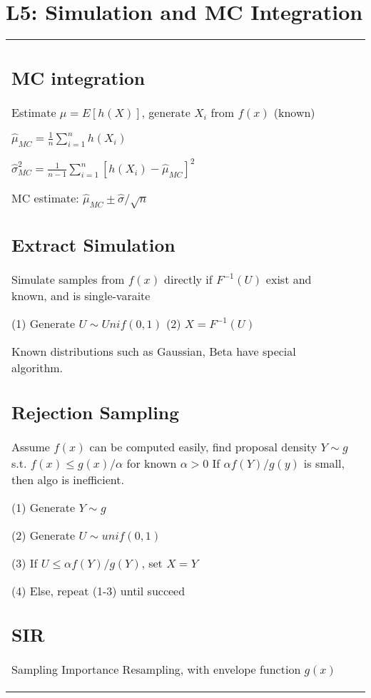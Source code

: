 \section{L5: Simulation and MC Integration}

\begin{tabulary}{\textwidth}{l L}

\subsection{MC integration}

Estimate $\mu = E[h(X)]$, generate $X_i$ from $f(x)$ (known)

$\hat\mu_{MC} = \frac{1}{n} \sum_{i=1}^n h(X_i)$

$\hat\sigma^2_{MC} = \frac{1}{n-1} \sum_{i=1}^n [h(X_i) - \hat\mu_{MC}]^2$

MC estimate: $\hat\mu_{MC} \pm \hat\sigma / \sqrt{n}$

\subsection{Extract Simulation}

Simulate samples from $f(x)$ directly if $F^{-1}(U)$ exist and known, and is single-varaite

(1) Generate $U\sim Unif(0, 1)$ (2) $X = F^{-1}(U)$

Known distributions such as Gaussian, Beta have special algorithm.

\subsection{Rejection Sampling}

Assume $f(x)$ can be computed easily, find proposal density $Y\sim g$ s.t. $f(x) \leq g(x)/\alpha$ for known $\alpha > 0$
If $\alpha f(Y)/g(y)$ is small, then algo is inefficient.

(1) Generate $Y\sim g$

(2) Generate $U\sim unif(0, 1)$

(3) If $U \leq \alpha f(Y) / g(Y)$, set $X = Y$

(4) Else, repeat (1-3) until succeed

\subsection{SIR}

Sampling Importance Resampling, with envelope function $g(x)$


\end{tabulary}
